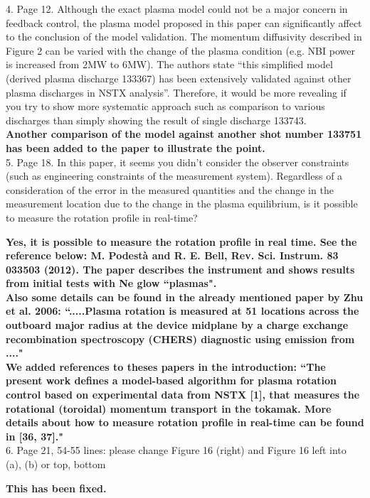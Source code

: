 \documentclass{scrartcl}
\newcommand{\response}[1]{\textcolor{red!80!black}{\bf #1}}
\begin{document}
4. Page 12. Although the exact plasma model could not be a major concern in feedback control, the plasma model proposed in this paper can significantly affect to the conclusion of the model validation. The momentum diffusivity described in Figure 2 can be varied with the change of the plasma condition (e.g. NBI power is increased from 2MW to 6MW). The authors state “this simplified model (derived plasma discharge 133367) has been extensively validated against other plasma discharges in NSTX analysis”. Therefore, it would be more revealing if you try to show more systematic approach such as comparison to various discharges than simply showing the result of single discharge 133743.\\
\response{Another comparison of the model against another shot number 133751 has been added to the paper to illustrate the point.}\\

5. Page 18. In this paper, it seems you didn’t consider the observer constraints (such as engineering constraints of the measurement system). Regardless of a consideration of the error in the measured quantities and the change in the measurement location due to the change in the plasma equilibrium, is it possible to measure the rotation profile in real-time?

\response{Yes, it is possible to measure the rotation profile in real time. See the reference below:
M. Podest\`a and R. E. Bell, Rev. Sci. Instrum. 83 033503 (2012).
The paper describes the instrument and shows results from initial tests with Ne glow ``plasmas".\\
Also some details can be found in the already mentioned paper by Zhu et al. 2006:
``.....Plasma rotation is measured at 51 locations across the outboard major radius at the device midplane by a charge exchange recombination spectroscopy (CHERS) diagnostic using emission from ...."\\
We added references to theses papers in the introduction:
``The present work defines a model-based algorithm for plasma rotation control based on experimental data from NSTX [1], that measures the rotational (toroidal) momentum transport in the tokamak. More details about how to measure rotation profile in real-time can be found in [36, 37]."} \\

6. Page 21, 54-55 lines: please change Figure 16 (right) and Figure 16 left into (a), (b) or top, bottom

\response{This has been fixed.}\\
\end{document}
